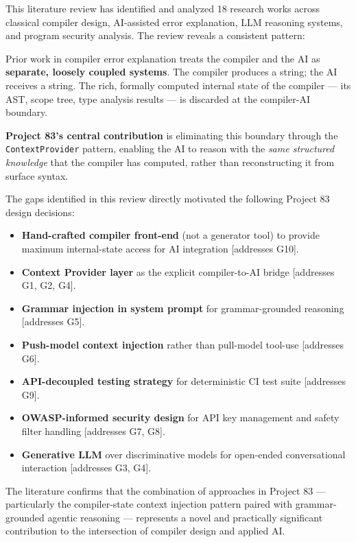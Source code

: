 \documentclass[a4paper,11pt]{article}
\begin{document}
This literature review has identified and analyzed 18 research works across classical compiler design, AI-assisted error explanation, LLM reasoning systems, and program security analysis. The review reveals a consistent pattern:

\begin{tcolorbox}[colback=blue!5!white, colframe=blue!70!black, title={Central Finding}]
Prior work in compiler error explanation treats the compiler and the AI as \textbf{separate, loosely coupled systems}. The compiler produces a string; the AI receives a string. The rich, formally computed internal state of the compiler --- its AST, scope tree, type analysis results --- is discarded at the compiler-AI boundary.

\textbf{Project 83's central contribution} is eliminating this boundary through the \texttt{ContextProvider} pattern, enabling the AI to reason with the \textit{same structured knowledge} that the compiler has computed, rather than reconstructing it from surface syntax.
\end{tcolorbox}

\vspace{1em}

The gaps identified in this review directly motivated the following Project 83 design decisions:

\begin{itemize}
    \item \textbf{Hand-crafted compiler front-end} (not a generator tool) to provide maximum internal-state access for AI integration [addresses G10].
    \item \textbf{Context Provider layer} as the explicit compiler-to-AI bridge [addresses G1, G2, G4].
    \item \textbf{Grammar injection in system prompt} for grammar-grounded reasoning [addresses G5].
    \item \textbf{Push-model context injection} rather than pull-model tool-use [addresses G6].
    \item \textbf{API-decoupled testing strategy} for deterministic CI test suite [addresses G9].
    \item \textbf{OWASP-informed security design} for API key management and safety filter handling [addresses G7, G8].
    \item \textbf{Generative LLM} over discriminative models for open-ended conversational interaction [addresses G3, G4].
\end{itemize}

The literature confirms that the combination of approaches in Project 83 --- particularly the compiler-state context injection pattern paired with grammar-grounded agentic reasoning --- represents a novel and practically significant contribution to the intersection of compiler design and applied AI.
\end{document}

